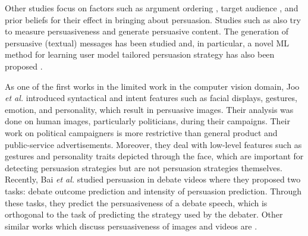 \documentclass[hidelinks,11pt,a4paper]{report}
\renewcommand{\cite}[1]{\citep{#1}}
\begin{document}
Other studies focus on factors such as argument ordering \cite{shaikh-etal-2020-examining,li-etal-2020-exploring-role}, target audience \cite{lukin-etal-2017-argument}, and prior beliefs \cite{el-baff-etal-2020-analyzing} for their effect in bringing about persuasion. Studies such as \cite{althoff2014ask,wei2016post} also try to measure persuasiveness and generate persuasive content. The generation of persuasive (textual) messages has been studied \cite{donadello2020explaining} and, in particular, a novel ML method for learning user model tailored persuasion strategy has also been proposed \cite{hadoux2021strategic, donadello2022machine}.



As one of the first works in the limited work in the computer vision domain, Joo \textit{et al.} \cite{joo2014visual} introduced syntactical and intent features such as facial displays, gestures, emotion, and personality, which result in persuasive images. Their analysis was done on human images, particularly politicians, during their campaigns. %
Their work on political campaigners is more restrictive than general product and public-service advertisements. Moreover, they deal with low-level features such as gestures and personality traits depicted through the face, which are important for detecting persuasion strategies but are not persuasion strategies themselves. Recently, Bai \textit{et al.} \cite{bai2021m2p2} studied persuasion in debate videos where they proposed two tasks: debate outcome prediction and intensity of persuasion prediction. Through these tasks, they predict the persuasiveness of a debate speech, which is orthogonal to the task of predicting the strategy used by the debater. Other similar works which discuss persuasiveness of images and videos are \cite{joo2015automated,siddiquie2015exploiting}.


\end{document}
